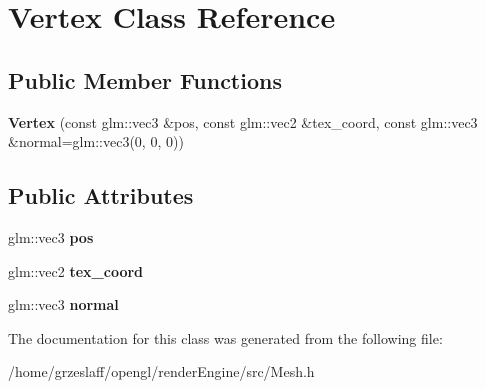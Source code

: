 \hypertarget{classVertex}{\section{Vertex Class Reference}
\label{classVertex}
}
\subsection*{Public Member Functions}
\begin{DoxyCompactItemize}
\item 
\hypertarget{classVertex_a191f2c1c8acde92da3c678b710cf3789}{{\bfseries Vertex} (const glm\-::vec3 \&pos, const glm\-::vec2 \&tex\-\_\-coord, const glm\-::vec3 \&normal=glm\-::vec3(0, 0, 0))}\label{classVertex_a191f2c1c8acde92da3c678b710cf3789}

\end{DoxyCompactItemize}
\subsection*{Public Attributes}
\begin{DoxyCompactItemize}
\item 
\hypertarget{classVertex_a858242dc7b40c034c5e13c589b30cfb4}{glm\-::vec3 {\bfseries pos}}\label{classVertex_a858242dc7b40c034c5e13c589b30cfb4}

\item 
\hypertarget{classVertex_a44ee386add2179067660f264982e59d1}{glm\-::vec2 {\bfseries tex\-\_\-coord}}\label{classVertex_a44ee386add2179067660f264982e59d1}

\item 
\hypertarget{classVertex_a3aa35fe84025ecf1acccb5f65f5577fd}{glm\-::vec3 {\bfseries normal}}\label{classVertex_a3aa35fe84025ecf1acccb5f65f5577fd}

\end{DoxyCompactItemize}


The documentation for this class was generated from the following file\-:\begin{DoxyCompactItemize}
\item 
/home/grzeslaff/opengl/render\-Engine/src/Mesh.\-h\end{DoxyCompactItemize}
